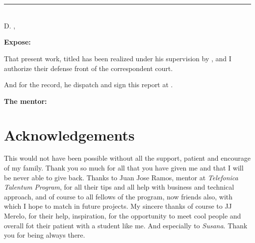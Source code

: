 \chapter*{}
\thispagestyle{empty}

\noindent\rule[-1ex]{\textwidth}{2pt}\\[4.5ex]

D. \textbf{\myMentor}, \myMentorStatus

\vspace{0.5cm}

\textbf{Expose:}

\vspace{0.5cm}

That present work, titled \textit{\textbf{\myTitle}}
has been realized under his supervision by \textbf{\myName}, and I authorize their defense front of the correspondent court.

\vspace{0.5cm}

And for the record, he dispatch and sign this report at \myDate.

\vspace{1cm}

\textbf{The mentor:}

\vspace{5cm}

\noindent \textbf{\myMentor}

\chapter*{Acknowledgements}
\thispagestyle{empty}

       \vspace{1cm}


This would not have been possible without all the support, patient and
encourage of my family. Thank you so much for all that you have given me and that
I will be never able to give back.
\intro
Thanks to Juan Jose Ramos, mentor at \textit{Telefonica Talentum Program}, for all their
tips and all help with business and technical approach, and of course to
all fellows of the program, now friends also, with which I hope to match in future projects.
\intro
My sincere thanks of course to JJ Merelo, for their help, inspiration, for
the opportunity to meet cool people and overall fot their patient with a student
like me.
\intro
And especially to \textit{Susana}. Thank you for being always there.
